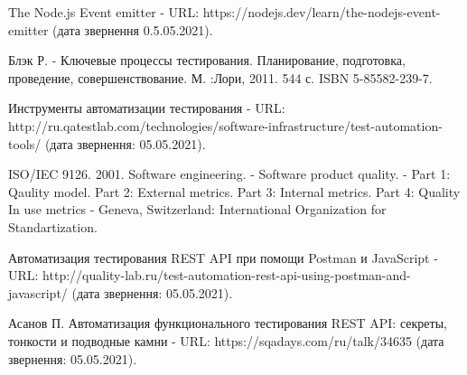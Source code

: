 \begin{thebibliography}{00}
      The Node.js Event emitter -
      URL: https://nodejs.dev/learn/the-nodejs-event-emitter
			(дата звернення 0.5.05.2021).

      Блэк Р. -
      Ключевые процессы тестирования.
      Планирование, подготовка, проведение, совершенствование. М. :Лори,
      2011. 544 с. ISBN 5-85582-239-7.

      Инструменты автоматизации тестирования -
      URL: http://ru.qatestlab.com/technologies/software-infrastructure/test-automation-tools/
      (дата звернення: 05.05.2021).

      ISO/IEC 9126. 2001. Software engineering. -
      Software product quality. -
      Part 1: Qaulity model. 
      Part 2: External metrics. 
      Part 3: Internal metrics. 
      Part 4: Quality In use metrics -
      Geneva, Switzerland: International Organization for Standartization.

      Автоматизация тестирования REST API при помощи Postman и JavaScript -
      URL: http://quality-lab.ru/test-automation-rest-api-using-postman-and-javascript/
      (дата звернення: 05.05.2021).

      Асанов П.
      Автоматизация функционального тестирования REST API:
      секреты, тонкости и подводные камни -
      URL: https://sqadays.com/ru/talk/34635
      (дата звернення: 05.05.2021).

\end{thebibliography}
\endgroup

\clearpage
